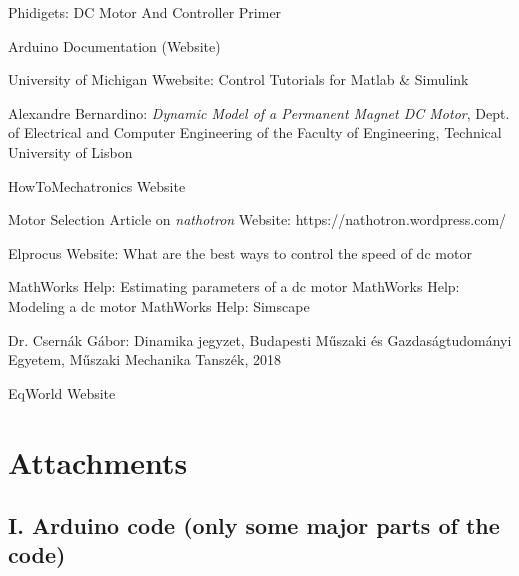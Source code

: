 \documentclass[12pt,english,twoside]{article}
\begin{document}
\begin{thebibliography}{1}
	 Phidigets: DC Motor And Controller Primer
	
	 Arduino Documentation (Website)
	
	  University of Michigan Wwebsite: Control Tutorials for Matlab \& Simulink
	
	  Alexandre Bernardino: \textit{Dynamic Model of a Permanent Magnet DC Motor}, Dept. of Electrical and Computer Engineering of the Faculty of Engineering, Technical University of Lisbon
	
	 HowToMechatronics Website
	
	 Motor Selection Article on \textit{nathotron} Website: https://nathotron.wordpress.com/
	
	 Elprocus Website: What are the best ways to control the speed of dc motor
	
	 MathWorks Help: Estimating parameters of a dc motor
	 MathWorks Help: Modeling a dc motor
	 MathWorks Help: Simscape
	
	 Dr. Csernák Gábor: Dinamika jegyzet, Budapesti Műszaki és Gazdaságtudományi Egyetem, Műszaki Mechanika Tanszék, 2018
	
	 EqWorld Website
	
	
	
	
\end{thebibliography}
\newpage

\section*{Attachments}
\subsection*{I. Arduino code (only some major parts of the code)}
\end{document}
